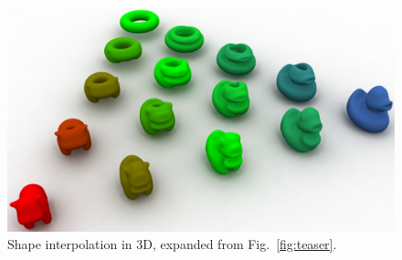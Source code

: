\begin{figure}[t]\centering
\includegraphics[width=\linewidth]{figures/teaser/triangleinterp.pdf}
\vspace{-4mm}
\caption{Shape interpolation in 3D, expanded from Fig.~\ref{fig:teaser}.}
\label{fig:shape_interpolation_3d2}
\end{figure}


